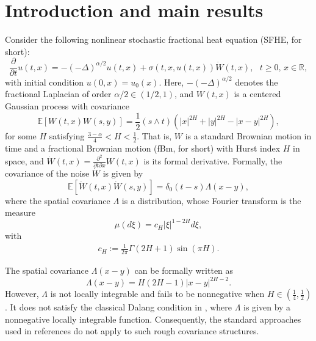 \documentclass[11pt,reqno]{amsart}
\numberwithin{equation}{section}
\def\RR{\mathbb{R}}
\newcommand{\1}{{\bf 1}}
\newcommand{\2}{{\bf 2}}
\begin{document}
\section{Introduction and main results}
 Consider the following nonlinear   stochastic fractional heat equation (SFHE, for short): 
 \begin{equation}\label{SFHE}
    \frac{\partial }{\partial t}u(t, x)= -(-\Delta)^{\alpha/2}u(t, x) +\sigma(t,x,u(t,x)) \dot{W}(t, x), \ \ \ t\ge0, \, x\in \mathbb R,
    \end{equation}
with initial condition $u(0,x)=u_0(x)$. Here,  $-(-\Delta)^{\alpha/2}$ denotes  the fractional Laplacian of order ${\alpha}/{2}\in (1/2,1)$, and $W(t, x)$ is a centered Gaussian process with  covariance 
\begin{equation}\label{CovW}
  \mathbb{E}\left[W(t, x)W(s, y)\right]=\frac{1}{2} \left(s\wedge t\right)\left( |x|^{2H}+|y|^{2H}-|x-y|^{2H} \right),
\end{equation}
for some $H$ satisfying $ \frac{3-\alpha}{4}<H<\frac{1}{2}$. That is, $W$ is a standard Brownian motion in time and a fractional Brownian motion (fBm, for short) with Hurst index $H$ in space, and $\dot W(t,x)=\frac{\partial^2}{\partial t\partial x}W(t,x)$ is its formal derivative.      Formally,  the covariance of the noise $\dot{W}$ is given by
    $$\mathbb E\left[\dot{W}(t,x)\dot{W}(s,y)\right]=\delta_0 ( t-s)\Lambda\left(x-y\right),$$
    where the spatial covariance $\Lambda$ is a distribution, whose Fourier transform is the measure 
    $$\mu(d\xi)=c_{H}|\xi|^{1-2H}d\xi,$$ with
         \begin{align} \label{e.c1}
   c_{H}:=\frac{1}{2\pi}\Gamma(2H+1)\sin(\pi H).
 \end{align}
     
   The spatial covariance $\Lambda(x-y)$ can be formally written as
    $$\Lambda(x-y)=H(2H-1) |x-y|^{2H-2}.$$ 
   However,   $\Lambda$ is not locally integrable and fails to be nonnegative when $H\in(\frac 14,\frac 12)$.  It does not satisfy the classical Dalang  condition in \cite{Dalang1999}, where $\Lambda$ is given by a nonnegative   locally integrable function.  Consequently, the standard approaches used in references \cite{DaPrato2014, Dalang1999, DQ, Walsh1986} do not apply to such rough covariance structures.
\end{document}
